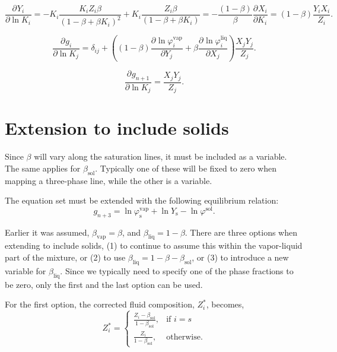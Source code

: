 \documentclass[internal,english]{sintefmemo2012}
\newcommand*{\pd}[3][]{\frac{\partial^{#1}#2}{\partial{#3}^{#1}}}%
\newcommand{\sol}{\text{sol}}
\newcommand{\liq}{\text{liq}}
\newcommand{\vap}{\text{vap}}
\newcommand{\scomp}{\text{s}\xspace}
\begin{document}
\begin{equation}
   \pd{Y_i}{\ln K_i} = -K_i\frac{K_i Z_i\beta}{\left(1-\beta+\beta K_i\right)^2} + K_i\frac{Z_i\beta}{\left(1-\beta+\beta K_i\right)} = -\frac{\left(1-\beta\right)}{\beta}\pd{X_i}{K_i} = \left(1-\beta\right)\frac{Y_iX_i}{Z_i}.
\end{equation}

\begin{equation}
   \pd{g_i}{\ln K_j} = \delta_{ij} + \left(\left(1-\beta\right)\pd{\ln \varphi^\vap_i}{Y_j} + \beta\pd{\ln \varphi^\liq_i}{X_j}\right)\frac{X_jY_j}{Z_j}.
\end{equation}

\begin{equation}
   \pd{g_{n+1}}{\ln K_j} = \frac{X_jY_j}{Z_j}.
\end{equation}

\section{Extension to include solids}


Since $\beta$ will vary along the saturation lines, it must be included as a variable. The same applies for $\beta_\sol$. Typically one of these will be fixed to zero when mapping a three-phase line, while the other is a variable.

The equation set must be extended with the following equilibrium relation:
\begin{equation}
  \label{eq:soleq}
   g_{n+3} = \ln \varphi^\vap_\scomp + \ln Y_\scomp - \ln \varphi^\sol .
\end{equation}

Earlier it was assumed, $\beta_\vap = \beta$, and $\beta_\liq = 1-\beta$. There are three options when extending to include solids, (1) to continue to assume this within the vapor-liquid part of the mixture, or (2) to use $\beta_\liq = 1-\beta-\beta_\sol$, or (3) to introduce a new variable for $\beta_\liq$. Since we typically need to specify one of the phase fractions to be zero, only the first and the last option can be used.

For the first option, the corrected fluid composition, $Z_i^*$, becomes,
\begin{equation}
  Z_i^* = \begin{cases}
    \frac{Z_i - \beta_\sol}{1-\beta_\sol},& \text{if } i = s\\
    \frac{Z_i}{1-\beta_\sol},            & \text{otherwise}.
\end{cases}
\label{eq:z_mod}
\end{equation}
\end{document}

